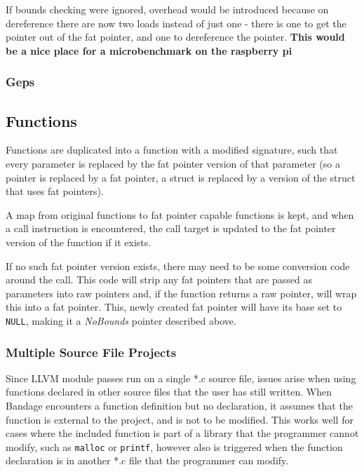 If bounds checking were ignored, overhead would be introduced because on dereference there are now two loads instead of just one - there is one to get the pointer out of the fat pointer, and one to dereference the pointer.
\textbf{This would be a nice place for a microbenchmark on the raspberry pi}

\subsubsection{Geps}

\subsection{Functions}

Functions are duplicated into a function with a modified signature, such that every parameter is replaced by the fat pointer version of that parameter (so a pointer is replaced by a fat pointer, a struct is replaced by a version of the struct that uses fat pointers).

A map from original functions to fat pointer capable functions is kept, and when a call instruction is encountered, the call target is updated to the fat pointer version of the function if it exists.

If no such fat pointer version exists, there may need to be some conversion code around the call.
This code will strip any fat pointers that are passed as parameters into raw pointers and, if the function returns a raw pointer, will wrap this into a fat pointer.
This, newly created fat pointer will have its base set to \verb!NULL!, making it a \textit{NoBounds} pointer described above.

\subsubsection{Multiple Source File Projects}

Since LLVM module passes run on a single *.c source file, issues arise when using functions declared in other source files that the user has still written.
When Bandage encounters a function definition but no declaration, it assumes that the function is external to the project, and is not to be modified.
This works well for cases where the included function is part of a library that the programmer cannot modify, such as \verb!malloc! or \verb!printf!, however also is triggered when the function declaration is in another *.c file that the programmer can modify.

